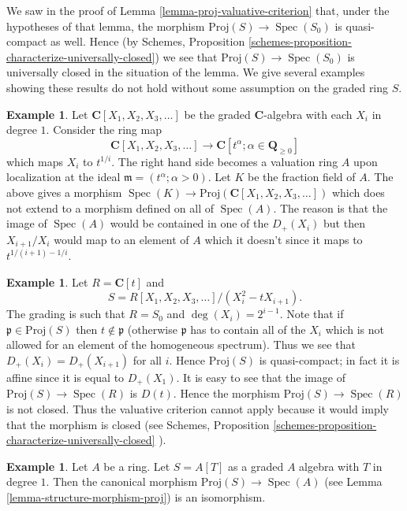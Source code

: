 \documentclass{stacks-project}
\theoremstyle{plain}
\theoremstyle{definition}
\newtheorem{example}[subsection]{Example}
\theoremstyle{remark}
\numberwithin{equation}{subsection}
\def\Spec{\mathop{\mathrm{Spec}}}
\begin{document}
\noindent
We saw in the proof of Lemma \ref{lemma-proj-valuative-criterion}
that, under the hypotheses of that lemma, the morphism
$\text{Proj}(S) \to \Spec(S_0)$ is quasi-compact as well. Hence (by
Schemes, Proposition \ref{schemes-proposition-characterize-universally-closed})
we see that $\text{Proj}(S) \to \Spec(S_0)$ is universally closed in
the situation of the lemma. We give several examples showing these results
do not hold without some assumption on the graded ring $S$.

\begin{example}
\label{example-not-existence-valuative-big-proj}
Let $\mathbf{C}[X_1, X_2, X_3, \ldots]$ be the graded $\mathbf{C}$-algebra
with each $X_i$ in degree $1$. Consider the ring map
$$
\mathbf{C}[X_1, X_2, X_3, \ldots]
\longrightarrow
\mathbf{C}[t^\alpha ; \alpha \in \mathbf{Q}_{\geq 0}]
$$
which maps $X_i$ to $t^{1/i}$. The right hand side becomes a valuation ring
$A$ upon localization at the ideal $\mathfrak m = (t^\alpha ; \alpha > 0)$.
Let $K$ be the fraction field of $A$. The above gives a morphism
$\Spec(K) \to \text{Proj}(\mathbf{C}[X_1, X_2, X_3, \ldots])$ which does not
extend to a morphism defined on all of $\Spec(A)$.
The reason is that the image of $\Spec(A)$ would be contained
in one of the $D_{+}(X_i)$ but then $X_{i + 1}/X_i$ would map
to an element of $A$ which it doesn't since it maps to
$t^{1/(i + 1) - 1/i}$.
\end{example}

\begin{example}
\label{example-not-existence-valuative-small-proj}
Let $R = \mathbf{C}[t]$ and
$$
S = R[X_1, X_2, X_3, \ldots]/(X_i^2 - tX_{i + 1}).
$$
The grading is such that $R = S_0$ and $\deg(X_i) = 2^{i - 1}$.
Note that if $\mathfrak p \in \text{Proj}(S)$ then
$t \not \in \mathfrak p$ (otherwise $\mathfrak p$ has to contain
all of the $X_i$ which is not allowed for an element of
the homogeneous spectrum). Thus we see that
$D_{+}(X_i) = D_{+}(X_{i + 1})$ for all $i$. Hence
$\text{Proj}(S)$ is quasi-compact; in fact it is affine
since it is equal to $D_{+}(X_1)$. It is easy to see that
the image of $\text{Proj}(S) \to \Spec(R)$ is
$D(t)$. Hence the morphism $\text{Proj}(S) \to \Spec(R)$
is not closed. Thus the valuative criterion cannot apply because
it would imply that the morphism is closed (see
Schemes, Proposition \ref{schemes-proposition-characterize-universally-closed}
).
\end{example}

\begin{example}
\label{example-trivial-proj}
Let $A$ be a ring.
Let $S = A[T]$ as a graded $A$ algebra with $T$ in degree $1$.
Then the canonical morphism $\text{Proj}(S) \to \Spec(A)$
(see Lemma \ref{lemma-structure-morphism-proj})
is an isomorphism.
\end{example}
\end{document}
